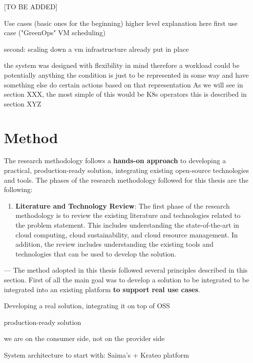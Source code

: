 [TO BE ADDED]

Use cases (basic ones for the beginning) higher level explanation here
first use case ("GreenOps" VM scheduling)

second: scaling down a vm 
infrastructure already put in place

the system was designed with flexibility in mind therefore a workload could be potentially anything
the condition is just to be represented in some way and have something else do certain actions based on that representation
As we will see in section XXX, the most simple of this would be K8s operators
this is described in section XYZ

\section{Method}

The research methodology follows a \textbf{hands-on approach} to developing a practical, production-ready solution, integrating existing open-source technologies and tools.
The phases of the research methodology followed for this thesis are the following:
\begin{enumerate}
    \item \textbf{Literature and Technology Review}: The first phase of the research methodology is to review the existing literature and technologies related to the problem statement. 
    This includes understanding the state-of-the-art in cloud computing, cloud sustainability, and cloud resource management. 
    In addition, the review includes understanding the existing tools and technologies that can be used to develop the solution.
\end{enumerate}









---
The method adopted in this thesis followed several principles described in this section.
First of all the main goal was to develop a solution to be integrated to be integrated into an existing platform \textbf{to support real use cases}.

Developing a real solution, integrating it on top of OSS

production-ready solution

we are on the consumer side, not on the provider side

System architecture to start with: Saima's + Krateo platform

